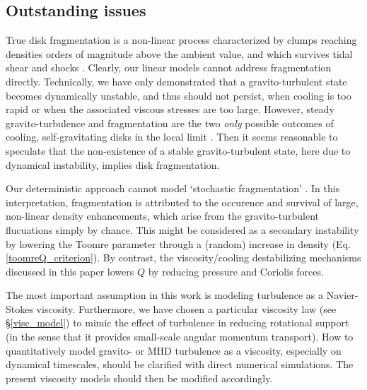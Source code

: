 \subsection{Outstanding issues}
True disk fragmentation is a non-linear process characterized by
clumps reaching densities orders of magnitude above the ambient value, and
which survives tidal shear and shocks \citep{paardekooper12,young16}.  
Clearly, our linear models cannot address fragmentation
directly. Technically, we have only demonstrated that a 
gravito-turbulent state becomes dynamically unstable, and thus should
not persist, when cooling is too rapid or when the associated viscous
stresses are too large.  However, steady gravito-turbulence and
fragmentation are the two \emph{only} possible outcomes of cooling, 
self-gravitating disks in the local limit \citep[][]{gammie01}.    
Then it seems reasonable to speculate that the non-existence of a stable
gravito-turbulent state, here due to dynamical instability, implies
disk fragmentation.   


Our deterministic approach cannot model `stochastic fragmentation'
\citep{paardekooper12,hopkins13}. In this interpretation,  
fragmentation is attributed to the occurence and survival 
of large, non-linear density enhancements, which arise from the
gravito-turbulent flucuations simply by chance. 
This might be considered as a secondary instability by lowering the
Toomre parameter through a (random) increase in density 
(Eq. \ref{toomreQ_criterion}). By contrast, the viscosity/cooling
destabilizing mechanisms discussed in this paper lowers $Q$ by
reducing pressure and Coriolis forces. %


The most important assumption in this work is modeling turbulence as a  
Navier-Stokes viscosity. Furthermore, we have chosen a particular  
viscosity law (see \S\ref{visc_model}) to mimic the effect of 
turbulence in reducing rotational support (in the sense that it
provides small-scale angular momentum transport). 
How to quantitatively model gravito- or MHD turbulence 
as a viscosity, especially on dynamical timescales, should be 
clarified with direct numerical simulations. The present viscosity
models should then be modified accordingly. 

